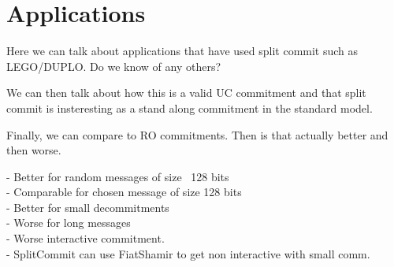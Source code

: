 \section{Applications}

Here we can talk about applications that have used split commit such as LEGO/DUPLO. Do we know of any others?


We can then talk about how this is a valid UC commitment and that split commit is insteresting as a stand along commitment in the standard model.

Finally, we can compare to RO commitments. Then is that actually better and then worse.

 - Better for random messages of size ~128 bits\\
 - Comparable for chosen message of size 128 bits\\
 - Better for small decommitments\\
 - Worse for long messages\\
 - Worse interactive commitment.\\
 - SplitCommit can use FiatShamir to get non interactive with small comm.

